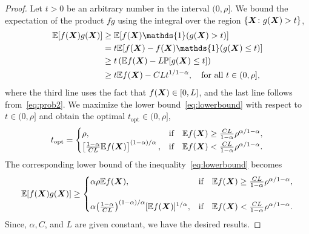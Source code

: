 \documentclass[11pt]{article}
\theoremstyle{plain}
\theoremstyle{definition}
\def\fixme#1#2{\textbf{\color{red}[FIXME (#1): #2]}}
\begin{document}
\begin{proof} Let $t>0$ be an arbitrary number in the interval $(0,\rho]$. We bound the expectation of the product $fg$ using the integral over the region $\{\bm X\colon g(\bm X)> t\}$, 
\begin{align}\label{eq:lowerbound}
\mathbb{E}[f(\mX)g(\mX)]& \geq  \mathbb{E}[f(\mX)\mathds{1}(g(\mX)>t)]\notag \\
& = t\mathbb{E}[f(\mX)-f(\mX)\mathds{1}(g(\mX)\leq t)]
\\
&\geq t\left(\mathbb{E}
f(\mX)-L\mathbb{P}[g(\mX)\leq t]\right)\notag \\
&\geq t\mathbb{E}f(\mX)-CLt^{1/1-\alpha}, \quad \text{for all }t\in(0,\rho],
\end{align}
where the third line uses the fact that $f(\bm X)\in[0,L]$, and the last line follows from~\eqref{eq:prob2}. We maximize the lower bound~\eqref{eq:lowerbound} with respect to $t\in(0,\rho]$ and obtain the optimal $t_{\text{opt}}\in(0,\rho]$,
\[
t_{\text{opt}}=\begin{cases}
\rho, & \text{if}\quad \mathbb{E}f(\bm X)\geq {CL\over 1-\alpha} \rho^{\alpha/ 1-\alpha},\\
\left[{1-\alpha \over CL}\mathbb{E}f(\bm X)\right]^{(1-\alpha)/ \alpha}, & \text{if}\quad \mathbb{E}f(\bm X) < {CL\over 1-\alpha} \rho^{\alpha
/ 1-\alpha}.
\end{cases}
\]
The corresponding lower bound of the inequality~\eqref{eq:lowerbound} becomes
\[
\mathbb{E}[f(\bm X)g(\bm X)]
\geq \begin{cases}
\alpha\rho\mathbb{E}f(\bm X), &\text{if}\quad \mathbb{E}f(\bm X)\geq {CL \over 1-\alpha} \rho^{\alpha/ 1-\alpha},\\
\\
\alpha{\left(1-\alpha\over CL\right)}^{(1-\alpha) / \alpha} [\mathbb{E}f(\bm X)]^{1/\alpha}, &\text{if}\quad \mathbb{E}f(\bm X)< {CL\over 1-\alpha} \rho^{\alpha /1-\alpha}.
\end{cases}
\]
Since, $\alpha, C$, and $L$ are given constant, we have the desired results.

\end{proof}
\end{document}
